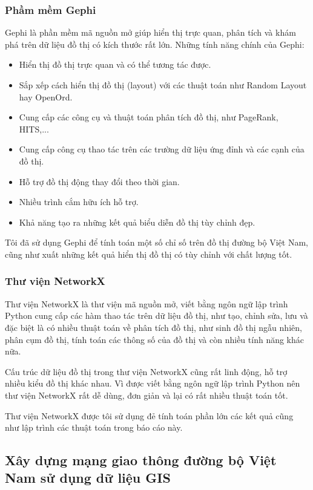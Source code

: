 \documentclass[14pt, oneside, a4paper, openany]{scrartcl}
\begin{document}
\subsubsection{Phầm mềm Gephi}
\cite{gephi} Gephi là phần mềm mã nguồn mở giúp hiển thị trực quan, phân tích và khám phá trên dữ liệu đồ thị có kích thước rất lớn.
Những tính năng chính của Gephi:
\begin{itemize}
	\item Hiển thị đồ thị trực quan và có thể tương tác được.
	\item Sắp xếp cách hiển thị đồ thị (layout) với các thuật toán như Random Layout hay OpenOrd.
	\item Cung cấp các công cụ và thuật toán phân tích đồ thị, như PageRank, HITS,...
	\item Cung cấp công cụ thao tác trên các trường dữ liệu ứng đỉnh và các cạnh của đồ thị.
	\item Hỗ trợ đồ thị động thay đổi theo thời gian.
	\item Nhiều trình cắm hữu ích hỗ trợ.
	\item Khả năng tạo ra những kết quả biểu diễn đồ thị tùy chỉnh đẹp.
\end{itemize}
Tôi đã sử dụng Gephi để tính toán một số chỉ số trên đồ thị đường bộ Việt Nam, cũng như xuất những kết quả hiển thị đồ thị có tùy chỉnh với chất lượng tốt.

\subsubsection{Thư viện NetworkX}
\cite{neworkx} Thư viện NetworkX là thư viện mã nguồn mở, viết bằng ngôn ngữ lập trình Python cung cấp các hàm thao tác trên dữ liệu đồ thị, như tạo, chỉnh sửa, lưu và đặc biệt là có nhiều thuật toán về phân tích đồ thị, như sinh đồ thị ngẫu nhiên, phân cụm đồ thị, tính toán các thông số của đồ thị và còn nhiều tính năng khác nữa.

Cấu trúc dữ liệu đồ thị trong thư viện NetworkX cũng rất linh động, hỗ trợ nhiều kiểu đồ thị khác nhau. Vì được viết bằng ngôn ngữ lập trình Python nên thư viện NetworkX rất dễ dùng, đơn giản và lại có rất nhiều thuật toán tốt.

Thư viện NetworkX được tôi sử dụng đẻ tính toán phần lớn các kết quả cũng như lập trình các thuật toán trong báo cáo này.
\subsection{Xây dựng mạng giao thông đường bộ Việt Nam sử dụng dữ liệu GIS}
\end{document}
